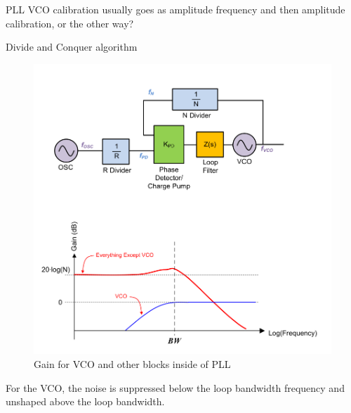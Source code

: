 PLL VCO calibration usually goes as amplitude frequency and then amplitude calibration, or the other way?

Divide and Conquer algorithm


\begin{figure}[!ht]
	\includegraphics[width=\linewidth]{Figures/PLL_basics_regarding_VCO.png}
	\caption{Gain for VCO and  other blocks inside of PLL}
	\label{fig:PLL_basics_regarding_VCO	}
\end{figure}

\begin{info}
	For the VCO, the noise is suppressed below the loop bandwidth frequency and unshaped above the loop bandwidth.
\end{info}






